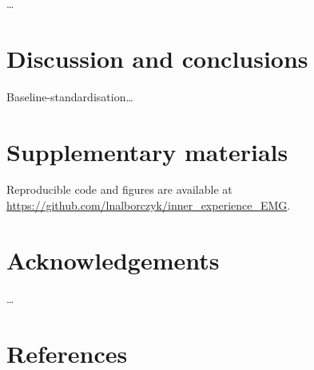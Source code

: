 \documentclass[
  english,
  man,floatsintext]{apa6}
\begin{document}
\ldots{}

\hypertarget{discussion-and-conclusions}{%
\section{Discussion and conclusions}\label{discussion-and-conclusions}}

Baseline-standardisation\ldots{}

\hypertarget{supp}{%
\section{Supplementary materials}\label{supp}}

Reproducible code and figures are available at \url{https://github.com/lnalborczyk/inner_experience_EMG}.

\hypertarget{acknowledgements}{%
\section*{Acknowledgements}\label{acknowledgements}}

\ldots{}

\hypertarget{references}{%
\section*{References}\label{references}}
\end{document}
